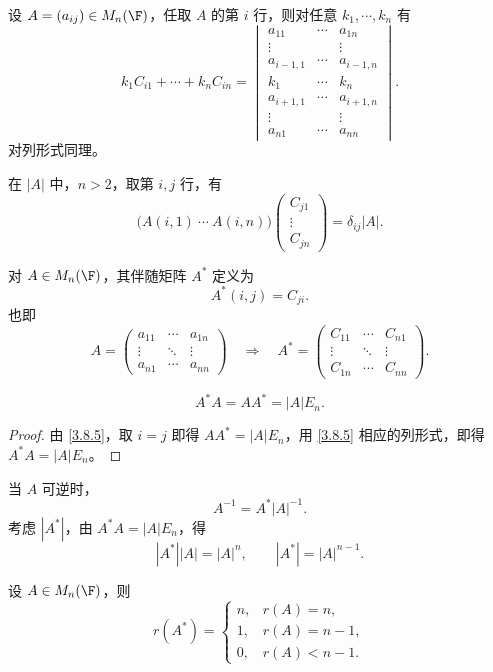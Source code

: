 \begin{corollary}\label{3.8.4}
	设 $A=(a_{ij})\in M_n(\F)$，任取 $A$ 的第 $i$ 行，则对任意 $k_1,\cdots,k_n$ 有
	\[
	k_1C_{i1}+\cdots+k_nC_{in}
	=
	\begin{vmatrix}
		a_{11}&\cdots&a_{1n}\\
		\vdots&&\vdots\\
		a_{i-1,1}&\cdots&a_{i-1,n}\\
		k_1&\cdots&k_n\\
		a_{i+1,1}&\cdots&a_{i+1,n}\\
		\vdots&&\vdots\\
		a_{n1}&\cdots&a_{nn}
	\end{vmatrix}.
	\]
	对列形式同理。
\end{corollary}

\begin{corollary}\label{3.8.5}
	在 $|A|$ 中，$n>2$，取第 $i,j$ 行，有
	\[
	\bigl(A(i,1)\ \cdots\ A(i,n)\bigr)
	\begin{pmatrix}
		C_{j1}\\
		\vdots\\
		C_{jn}
	\end{pmatrix}
	=\delta_{ij}|A|.
	\]
\end{corollary}

\begin{definition}\label{3.8.6}\label{p1:concept:c3-l2481}
	对 $A\in M_n(\F)$，其伴随矩阵 $A^*$ 定义为
	\[
	A^*(i,j)=C_{ji}.
	\]
	也即
	\[
	A=\begin{pmatrix}
		a_{11}&\cdots&a_{1n}\\
		\vdots&\ddots&\vdots\\
		a_{n1}&\cdots&a_{nn}
	\end{pmatrix}
	\quad\Longrightarrow\quad
	A^*=\begin{pmatrix}
		C_{11}&\cdots&C_{n1}\\
		\vdots&\ddots&\vdots\\
		C_{1n}&\cdots&C_{nn}
	\end{pmatrix}.
	\]
\end{definition}

\begin{theorem}\label{3.8.7}
	\[
	A^*A=AA^*=|A|E_n.
	\]
\end{theorem}

\begin{proof}
	由 \ref{3.8.5}，取 $i=j$ 即得 $AA^*=|A|E_n$，用 \ref{3.8.5} 相应的列形式，即得 $A^*A=|A|E_n$。
	
	
\end{proof}
当 $A$ 可逆时，
\[
A^{-1}=A^*|A|^{-1}.
\]
考虑 $|A^*|$，由 $A^*A=|A|E_n$，得
\[
|A^*||A|=|A|^n,
\qquad |A^*|=|A|^{n-1}.
\]
\begin{proposition}\label{3.8.8}
	设 $A\in M_n(\F)$，则
	\[
	r(A^*)=
	\begin{cases}
		n, & r(A)=n,\\
		1, & r(A)=n-1,\\
		0, & r(A)<n-1.
	\end{cases}
	\]
\end{proposition}

